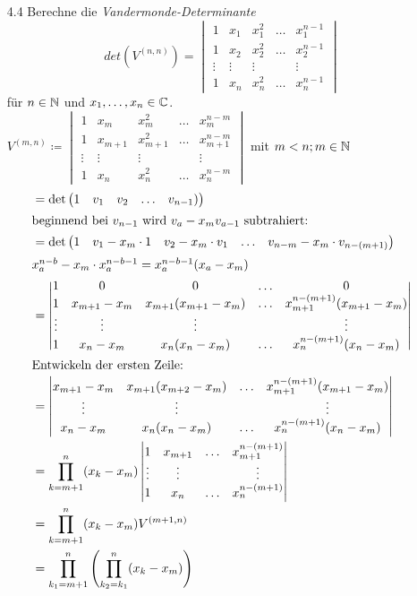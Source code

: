 \documentclass{HM}
\begin{document}
\begin{enumerate}
	\item[4.4] Berechne die \textit{Vandermonde-Determinante}\\
		$$det(V^{(n,n)})=\begin{vmatrix}
			1&x_1&x_1^2&\hdots&x_1^{n-1}\\
			1&x_2&x_2^2&\hdots&x_2^{n-1}\\
			\vdots&\vdots&\vdots&&\vdots\\
			1&x_n&x_n^2&\hdots&x_n^{n-1}
		\end{vmatrix}$$
		für $n\in\mathbb{N}$ und $x_1,\hdots,x_n\in\mathbb{C}$.\\
		$V^{(m,n)}\coloneqq\begin{vmatrix}
			1&x_m&x_m^2&\hdots&x_m^{n-m}\\
			1&x_{m+1}&x_{m+1}^2&\hdots&x_{m+1}^{n-m}\\
			\vdots&\vdots&\vdots&&\vdots\\
			1&x_n&x_n^2&\hdots&x_n^{n-m}
		\end{vmatrix}$ mit $m<n; m\in\mathbb{N}$
		\begin{align*}
			&=\det\begin{pmatrix}1&v_1&v_2&\hdots&v_{n-1})\end{pmatrix}\\
			\intertext{beginnend bei $v_{n-1}$ wird $v_a-x_mv_{a-1}$ subtrahiert:}
			&=\det\begin{pmatrix}1&v_1-x_m\cdot 1&v_2-x_m\cdot v_1&\hdots&v_{n-m}-x_m\cdot v_{n-(m+1)}\end{pmatrix}\\
			\intertext{$x_a^{n-b}-x_m\cdot x_a^{n-b-1} = x_a^{n-b-1}(x_a-x_m)$}
			&=\begin{vmatrix}
				1&0&0&\hdots&0\\
				1&x_{m+1}-x_m&x_{m+1}(x_{m+1}-x_m)&\hdots&x_{m+1}^{n-(m+1)}(x_{m+1}-x_m)\\
				\vdots&\vdots&\vdots&&\vdots\\
				1&x_n-x_m&x_n(x_n-x_m)&\hdots&x_n^{n-(m+1)}(x_n-x_m)
			\end{vmatrix}\\
			\intertext{Entwickeln der ersten Zeile:}
			&=\begin{vmatrix}
				x_{m+1}-x_m&x_{m+1}(x_{m+2}-x_m)&\hdots&x_{m+1}^{n-(m+1)}(x_{m+1}-x_m)\\
				\vdots&\vdots&&\vdots\\
				x_n-x_m&x_n(x_n-x_m)&\hdots&x_n^{n-(m+1)}(x_n-x_m)
			\end{vmatrix}\\
			&=\prod\limits_{k=m+1}^n(x_k-x_m)\begin{vmatrix}
				1&x_{m+1}&\hdots&x_{m+1}^{n-(m+1)}\\
				\vdots&\vdots&&\vdots\\
				1&x_n&\hdots&x_n^{n-(m+1)}
			\end{vmatrix}\\
			&=\prod\limits_{k=m+1}^n(x_k-x_m)V^{(m+1, n)}\\
			&=\prod\limits_{k_1=m+1}^n\left(\prod\limits_{k_2=k_1}^n(x_k-x_m)\right)
		\end{align*}
		

\end{enumerate}
\end{document}
